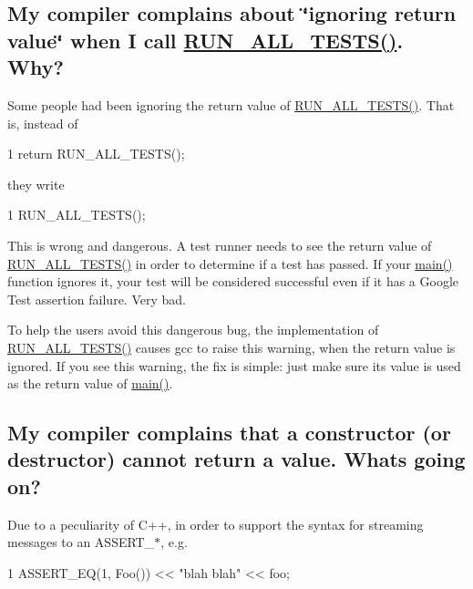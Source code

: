 \subsection*{My compiler complains about \char`\"{}ignoring return value\char`\"{} when I call \hyperlink{gtest_8h_a853a3792807489591d3d4a2f2ff9359f}{R\+U\+N\+\_\+\+A\+L\+L\+\_\+\+T\+E\+S\+T\+S()}. Why?}

Some people had been ignoring the return value of {\ttfamily \hyperlink{gtest_8h_a853a3792807489591d3d4a2f2ff9359f}{R\+U\+N\+\_\+\+A\+L\+L\+\_\+\+T\+E\+S\+T\+S()}}. That is, instead of


\begin{DoxyCode}
1 return RUN\_ALL\_TESTS();
\end{DoxyCode}


they write


\begin{DoxyCode}
1 RUN\_ALL\_TESTS();
\end{DoxyCode}


This is wrong and dangerous. A test runner needs to see the return value of {\ttfamily \hyperlink{gtest_8h_a853a3792807489591d3d4a2f2ff9359f}{R\+U\+N\+\_\+\+A\+L\+L\+\_\+\+T\+E\+S\+T\+S()}} in order to determine if a test has passed. If your {\ttfamily \hyperlink{app_2main_8cpp_ae66f6b31b5ad750f1fe042a706a4e3d4}{main()}} function ignores it, your test will be considered successful even if it has a Google Test assertion failure. Very bad.

To help the users avoid this dangerous bug, the implementation of {\ttfamily \hyperlink{gtest_8h_a853a3792807489591d3d4a2f2ff9359f}{R\+U\+N\+\_\+\+A\+L\+L\+\_\+\+T\+E\+S\+T\+S()}} causes gcc to raise this warning, when the return value is ignored. If you see this warning, the fix is simple\+: just make sure its value is used as the return value of {\ttfamily \hyperlink{app_2main_8cpp_ae66f6b31b5ad750f1fe042a706a4e3d4}{main()}}.

\subsection*{My compiler complains that a constructor (or destructor) cannot return a value. What\textquotesingle{}s going on?}

Due to a peculiarity of C++, in order to support the syntax for streaming messages to an {\ttfamily A\+S\+S\+E\+R\+T\+\_\+$\ast$}, e.\+g.


\begin{DoxyCode}
1 ASSERT\_EQ(1, Foo()) << "blah blah" << foo;
\end{DoxyCode}


